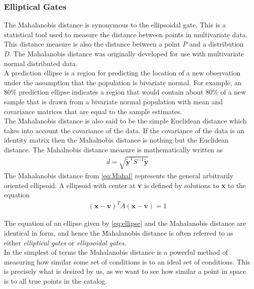 \documentclass[]{aiaa-tc}%
\begin{document}
\subsubsection{Elliptical Gates}

The Mahalanobis distance is synonymous to the ellipsoidal gate. This is a statistical tool used to measure the distance between points in multivariate data. This distance measure is also the distance between a point \textit{P} and a distribution \textit{D}. The Mahalanobis distance was originally developed for use with multivariate normal distributed data.\\

A prediction ellipse is a region for predicting the location of a new observation under the assumption that the population is bivariate normal. For example, an $80\%$ prediction ellipse indicates a region that would contain about $80\%$ of a new sample that is drawn from a bivariate normal population with mean and covariance matrices that are equal to the sample estimates.\\

The Mahalanobis distance is also said to be the simple Euclidean distance which takes into account the covariance of the data. If the covariance of the data is an identity matrix then the Mahalnobis distance is nothing but the Euclidean distance. The Mahalnobis distance measure is mathematically written as
\begin{align}
\label{eq:Mahal}
d = \sqrt{\tilde{\textbf{y}}^TS^{-1}\tilde{\textbf{y}}}
\end{align}
The Mahalanobis distance from \cref{eq:Mahal} represents the general arbitrarily oriented ellipsoid. A ellipsoid with center at \textbf{v} is defined by solutions to \textbf{x} to the equation
\begin{align}
\label{eq:ellipse}
(\textbf{x}-\textbf{v})^{T}A(\textbf{x}-\textbf{v})  = 1
\end{align}

The equation of an ellipse given by \cref{eq:ellipse} and the Mahalanobis distance are identical in form, and hence the Mahalanobis distance is often referred to as either \textit{elliptical gates} or \textit{ellipsoidal gates}.\\

In the simplest of terms the Mahalanobis distance is a powerful method of measuring how similar some set of conditions is to an ideal set of conditions. This is precisely what is desired by us, as we want to see how similar a point in space is to all true points in the catalog.\\
\end{document}
